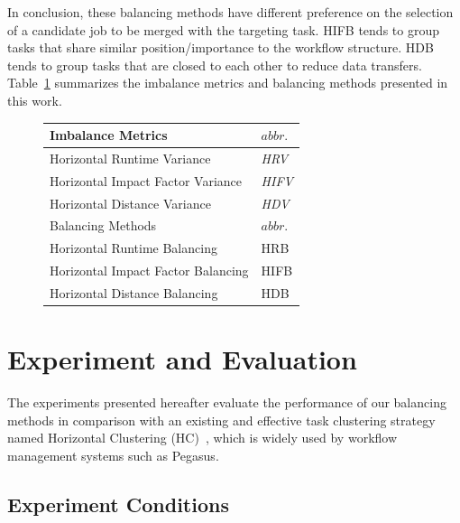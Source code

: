 \documentclass[final]{IEEEtran}
\begin{document}
In conclusion, these balancing methods have different preference on the selection of a candidate job to be merged with the targeting task. HIFB tends to group tasks that share similar position/importance to the workflow structure. HDB tends to group tasks that are closed to each other to reduce data transfers. Table~\ref{tab:2} summarizes the imbalance metrics and balancing methods presented in this work. 

\begin{figure}[htb]
	\centering
	\begin{tabular}{l|l}
		\hline
		Imbalance Metrics & $abbr.$   \\
		\hline
		Horizontal Runtime Variance & \emph{HRV}   \\ 
		Horizontal Impact Factor Variance & \emph{HIFV} \\ 
		Horizontal Distance Variance & \emph{HDV}  \\ 
		\hline
		Balancing Methods & $abbr.$  \\
		\hline
		Horizontal Runtime Balancing & HRB   \\ 
		Horizontal Impact Factor Balancing & HIFB\\ 
		Horizontal Distance Balancing & HDB \\ 
		\hline
	\end{tabular}
	\label{tab:2}
	\vspace{-10pt}
\end{figure}



\section{Experiment and Evaluation}
\label{sec:experiments}

The experiments presented hereafter evaluate the performance of our balancing methods in comparison with an existing and effective task clustering strategy named Horizontal Clustering (HC)~\cite{Singh:2008:WTC:1341811.1341822}, which is widely used by workflow management systems such as Pegasus. 

\subsection{Experiment Conditions}
\end{document}
